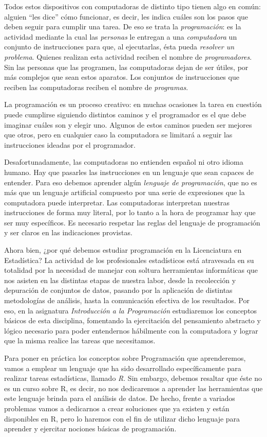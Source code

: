 \documentclass[
]{book}
\begin{document}
Todos estos dispositivos con computadoras de distinto tipo tienen algo en común: alguien ``les dice'' cómo funcionar, es decir, les indica cuáles son los pasos que deben seguir para cumplir una tarea. De eso se trata la \emph{programación}: es la actividad mediante la cual las \emph{personas} le entregan a una \emph{computadora} un conjunto de instrucciones para que, al ejecutarlas, ésta pueda \emph{resolver un problema}. Quienes realizan esta actividad reciben el nombre de \emph{programadores}. Sin las personas que las programen, las computadoras dejan de ser útiles, por más complejos que sean estos aparatos. Los conjuntos de instrucciones que reciben las computadoras reciben el nombre de \emph{programas}.

La programación es un proceso creativo: en muchas ocasiones la tarea en cuestión puede cumplirse siguiendo distintos caminos y el programador es el que debe imaginar cuáles son y elegir uno. Algunos de estos caminos pueden ser mejores que otros, pero en cualquier caso la computadora se limitará a seguir las instrucciones ideadas por el programador.

Desafortunadamente, las computadoras no entienden español ni otro idioma humano. Hay que pasarles las instrucciones en un lenguaje que sean capaces de entender. Para eso debemos aprender algún \emph{lenguaje de programación}, que no es más que un lenguaje artificial compuesto por una serie de expresiones que la computadora puede interpretar. Las computadoras interpretan nuestras instrucciones de forma muy literal, por lo tanto a la hora de programar hay que ser muy específicos. Es necesario respetar las reglas del lenguaje de programación y ser claros en las indicaciones provistas.

Ahora bien, ¿por qué debemos estudiar programación en la Licenciatura en Estadística? La actividad de los profesionales estadísticos está atravesada en su totalidad por la necesidad de manejar con soltura herramientas informáticas que nos asisten en las distintas etapas de nuestra labor, desde la recolección y depuración de conjuntos de datos, pasando por la aplicación de distintas metodologías de análisis, hasta la comunicación efectiva de los resultados. Por eso, en la asignatura \emph{Introducción a la Programación} estudiaremos los conceptos básicos de esta disciplina, fomentando la ejercitación del pensamiento abstracto y lógico necesario para poder entendernos hábilmente con la computadora y lograr que la misma realice las tareas que necesitamos.

Para poner en práctica los conceptos sobre Programación que aprenderemos, vamos a emplear un lenguaje que ha sido desarrollado específicamente para realizar tareas estadísticas, llamado \emph{R}. Sin embargo, debemos resaltar que éste no es un curso sobre R, es decir, no nos dedicaremos a aprender las herramientas que este lenguaje brinda para el análisis de datos. De hecho, frente a variados problemas vamos a dedicarnos a crear soluciones que ya existen y están disponibles en R, pero lo haremos con el fin de utilizar dicho lenguaje para aprender y ejercitar nociones básicas de programación.
\end{document}
